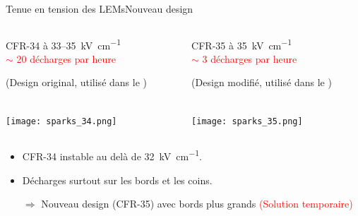     \begin{frame}{Tenue en tension des LEMs}{Nouveau design}
   		\begin{columns}
    		\begin{column}{0.5\textwidth}
    			\begin{center}
	    			\begin{scriptsize}
		    			CFR-34 à 33--\SI{35}{\kilo\volt\per\centi\meter}\\
		    			\textcolor{red}{$\sim$ 20 décharges par heure}\\
		    		\end{scriptsize}
	    			\begin{tiny}
		    			(Design original, utilisé dans le \TOO{})
		    		\end{tiny}\\
	    			\texttt{[image: sparks\_34.png]}
    			\end{center}
    		\end{column}\hfill
    		\begin{column}{0.5\textwidth}
    			\begin{center}
	    			\begin{scriptsize}
		    			CFR-35 à \SI{35}{\kilo\volt\per\centi\meter} \\
		    			\textcolor{red}{$\sim$ 3 décharges par heure}\\
		    		\end{scriptsize}
	    			\begin{tiny}
	    				(Design modifié, utilisé dans le \SSS{})
	   				\end{tiny}\\
	    			\texttt{[image: sparks\_35.png]}
	    		\end{center}
    		\end{column}
    	\end{columns}\vspace{0.1cm}
    	\begin{columns}
    		\begin{column}{0.5\textwidth}
    			\begin{scriptsize}
	    			\begin{itemize}
	    				\item CFR-34 instable au delà de \SI{32}{\kilo\volt\per\centi\meter}.
	    				\item Décharges surtout sur les bords et les coins.
	    			\end{itemize}
	    			\begin{itemize}
	    				\item[$\Rightarrow$] Nouveau design (CFR-35) avec bords plus grands \textcolor{red}{(Solution temporaire)}

\end{itemize}
\end{scriptsize}
\end{column}
\end{columns}
\end{frame}
